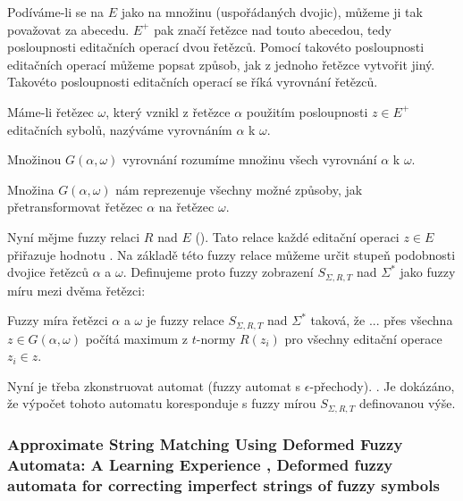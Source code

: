 \documentclass[a4paper,10pt]{article}
\begin{document}
Podíváme-li se na $E$ jako na množinu (uspořádaných dvojic), můžeme ji tak považovat za abecedu. $E^+$ pak značí řetězce nad touto abecedou, tedy posloupnosti editačních operací dvou řetězců. Pomocí takovéto posloupnosti editačních operací můžeme popsat způsob, jak z jednoho řetězce vytvořit jiný. Takovéto posloupnosti editačních operací se říká vyrovnání řetězců.

\begin{definition}[Vyrovnání]
Máme-li řetězec $\omega$, který vznikl z řetězce $\alpha$ použitím posloupnosti $z \in E^+$ editačních sybolů, nazýváme vyrovnáním $\alpha$ k $\omega$.
\end{definition}

\begin{definition}
Množinou $G(\alpha, \omega)$ vyrovnání rozumíme množinu všech vyrovnání $\alpha$ k $\omega$. 
\end{definition}
Množina $G(\alpha, \omega)$ nám reprezenuje všechny možné způsoby, jak přetransformovat řetězec $\alpha$ na řetězec $\omega$. 

Nyní mějme fuzzy relaci $R$ nad $E$ (). Tato relace každé editační operaci $z \in E$ přiřazuje hodnotu . Na základě této fuzzy relace můžeme určit stupeň podobnosti dvojice řetězců $\alpha$ a $\omega$. Definujeme proto fuzzy zobrazení $S_{\Sigma, R, T}$ nad $\Sigma^*$ jako fuzzy míru mezi dvěma řetězci:
\begin{definition}
Fuzzy míra řetězci $\alpha$ a $\omega$ je fuzzy relace $S_{\Sigma, R, T}$ nad $\Sigma^*$ taková, že ...  přes všechna $z \in G(\alpha, \omega)$ počítá maximum z $t$-normy $R(z_i)$ pro všechny editační operace $z_i \in z$.
\end{definition}

Nyní je třeba zkonstruovat automat (fuzzy automat s $\epsilon$-přechody). . Je dokázáno, že výpočet tohoto automatu koresponduje s fuzzy mírou $S_{\Sigma, R, T}$ definovanou výše.


\subsubsection*{Approximate String Matching Using Deformed Fuzzy Automata: A Learning Experience \cite{AstGariGonVillFar-ApprStrMatUsiDefFuzzAutLearExpr}, Deformed fuzzy automata for correcting imperfect strings of fuzzy symbols \cite{GarMenEchAstFar-DefFuzzAutCorImpStrFuzzSyms}}
\end{document}
